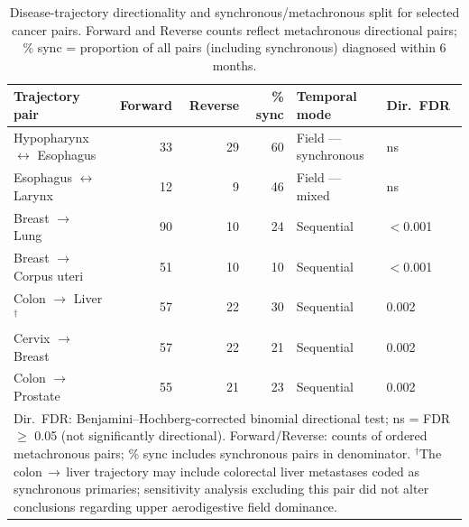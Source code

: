 \documentclass[review,12pt]{elsarticle}
\begin{document}
\begin{table}[H]
  \centering
  \caption{Disease-trajectory directionality and synchronous/metachronous split
    for selected cancer pairs. Forward and Reverse counts reflect metachronous
    directional pairs; \% sync = proportion of all pairs (including synchronous)
    diagnosed within 6 months.}
  \label{tab:trajectories}
  \begin{tabular}{lrrrll}
    \toprule
    Trajectory pair & Forward & Reverse & \% sync & Temporal mode &
    Dir.\ FDR \\
    \midrule
    Hypopharynx $\leftrightarrow$ Esophagus  &  33 & 29 & 60 &
      Field --- synchronous  & ns \\
    Esophagus $\leftrightarrow$ Larynx       &  12 &  9 & 46 &
      Field --- mixed        & ns \\
    Breast $\rightarrow$ Lung                &  90 & 10 & 24 &
      Sequential             & $<$0.001 \\
    Breast $\rightarrow$ Corpus uteri        &  51 & 10 & 10 &
      Sequential             & $<$0.001 \\
    Colon $\rightarrow$ Liver$^\dagger$       &  57 & 22 & 30 &
      Sequential             & 0.002 \\
    Cervix $\rightarrow$ Breast              &  57 & 22 & 21 &
      Sequential             & 0.002 \\
    Colon $\rightarrow$ Prostate             &  55 & 21 & 23 &
      Sequential             & 0.002 \\
    \bottomrule
    \multicolumn{6}{p{0.85\textwidth}}{\small Dir.\ FDR: Benjamini--Hochberg-corrected
      binomial directional test; ns = FDR $\geq$ 0.05 (not significantly directional).
      Forward/Reverse: counts of ordered metachronous pairs;
      \% sync includes synchronous pairs in denominator.
      $^\dagger$The colon$\,\rightarrow\,$liver trajectory may include colorectal
      liver metastases coded as synchronous primaries; sensitivity analysis
      excluding this pair did not alter conclusions regarding upper aerodigestive
      field dominance.}
  \end{tabular}
\end{table}
\end{document}
